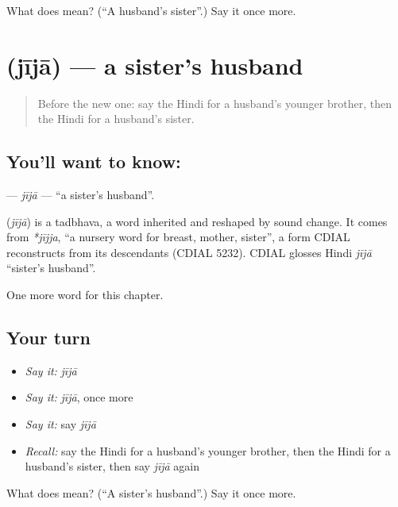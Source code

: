 \begin{tcolorbox}[breakable,colback=teal!4,colframe=teal!35!black,title={Before you move on}]
What does  mean? (\textquotedblleft{}A husband's sister\textquotedblright{}.) Say it once more.
\end{tcolorbox}
\section[\texorpdfstring{\hi{जीजा} (jījā)}{जीजा (jījā)}]{ (jījā) — a sister's husband}

\label{lesson:HI-C255-jija}



\begin{quote}
Before the new one: say the Hindi for a husband's younger brother, then the Hindi for a husband's sister.
\end{quote}

\subsection*{You'll want to know: }
\textbf{} — \emph{jījā} — \textquotedblleft{}a sister's husband\textquotedblright{}.

\begin{cousinweb}
\textbf{} (\emph{jījā}) is a tadbhava, a word inherited and reshaped by sound change. It comes from \emph{*jījja}, \textquotedblleft{}a nursery word for breast, mother, sister\textquotedblright{}, a form CDIAL reconstructs from its descendants (CDIAL 5232). CDIAL glosses Hindi \emph{jījā} \textquotedblleft{}sister's husband\textquotedblright{}.
\end{cousinweb}

\begin{grammarlens}[title={What you've built}]
One more word for this chapter.
\end{grammarlens}

\subsection*{Your turn}
\begin{itemize}
\raggedright
  \item \emph{Say it:} \emph{jījā}
  \item \emph{Say it:} \emph{jījā}, once more
  \item \emph{Say it:} say \emph{jījā}
  \item \emph{Recall:} say the Hindi for a husband's younger brother, then the Hindi for a husband's sister, then say \emph{jījā} again
\end{itemize}

\begin{tcolorbox}[breakable,colback=teal!4,colframe=teal!35!black,title={Before you move on}]
What does  mean? (\textquotedblleft{}A sister's husband\textquotedblright{}.) Say it once more.
\end{tcolorbox}
